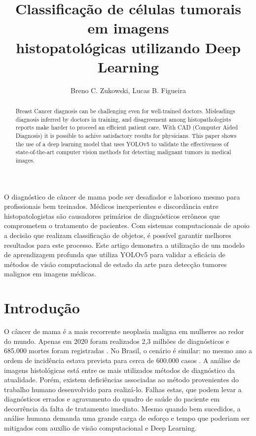 \documentclass[12pt]{article}
\title{Classificação de células tumorais em imagens\\ histopatológicas utilizando Deep Learning}
\author{Breno C. Zukowski\inst{1}, Lucas B. Figueira\inst{1}}
\begin{document}
\maketitle

\begin{abstract}
  Breast Cancer diagnosis can be challenging even for well-trained doctors. Misleadings diagnosis inferred by doctors in training, and disagreement among histopathologists reports make harder to proceed an efficient patient care. With CAD (Computer Aided Diagnosis) it is possible to achive satisfactory results for physicians. This paper shows the use of a deep learning model that uses YOLOv5 to validate the effectiveness of state-of-the-art computer vision methods for detecting malignant tumors in medical images.
\end{abstract}

\begin{resumo}
  O diagnóstico de câncer de mama pode ser desafiador e laborioso mesmo para profissionais bem treinados.
  Médicos inexperientes e discordância entre histopatologistas são causadores primários de diagnósticos errôneos
  que comprometem o tratamento de pacientes. Com sistemas computacionais de apoio a decisão que realizam classificação de objetos, é possível garantir melhores resultados para este processo. Este artigo demonstra a utilização
  de um modelo de aprendizagem profunda que utiliza YOLOv5 para validar a eficácia de métodos de visão computacional de estado da arte para detecção tumores malignos em imagens médicas.
\end{resumo}


\section{Introdução}

O câncer de mama é a mais recorrente neoplasia maligna em mulheres ao redor do mundo. Apenas em 2020 foram realizados 2,3 milhões de diagnósticos e 685.000 mortes foram registradas \cite{who2021}. No Brasil, o cenário é similar: no mesmo ano a ordem de incidência estava prevista para cerca de 600.000 casos \cite{inca2018}. A análise de imagens histológicas está entre os mais utilizados métodos de diagnóstico da atualidade. Porém, existem deficiências associadas ao método provenientes do trabalho humano desenvolvido para realizá-lo. Falhas estas, que podem levar a diagnósticos errados e agravamento do quadro de saúde do paciente em decorrência da falta de tratamento imediato. Mesmo quando bem sucedidos, a análise humana demanda uma grande carga de esforço e tempo que poderiam ser mitigados com auxílio de visão computacional e Deep Learning.
\end{document}
